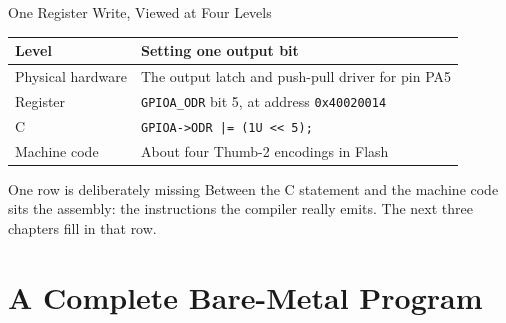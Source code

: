 \documentclass[9pt,aspectratio=169,xcolor=table]{beamer}
\newcommand{\shl}{\texttt{<{}<}}
\begin{document}
\begin{frame}{One Register Write, Viewed at Four Levels}
    \begin{center}
    {\normalsize
    \striped
    \begin{tabular}{@{}l R{.6\textwidth}@{}}
        \toprule
        \textbf{Level} & \textbf{Setting one output bit} \\
        \midrule
        Physical hardware & The output latch and push-pull driver for pin PA5 \\
        Register & \texttt{GPIOA\_ODR} bit 5, at address \texttt{0x40020014} \\
        C & \texttt{GPIOA->ODR |= (1U \shl\ 5);} \\
        Machine code & About four Thumb-2 encodings in Flash \\
        \bottomrule
    \end{tabular}}
    \end{center}

    \vspace{3mm}
    \begin{block}{One row is deliberately missing}
        Between the C statement and the machine code sits the \alert{assembly}: the instructions the compiler really emits. The next three chapters fill in that row.
    \end{block}
\end{frame}


\section{A Complete Bare-Metal Program}
\end{document}
